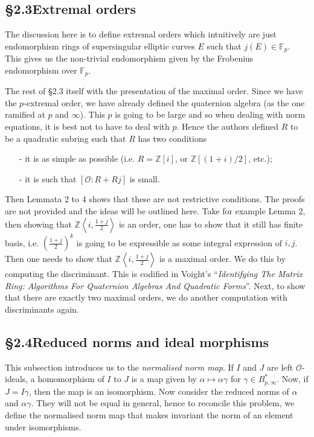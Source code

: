 \documentclass{amsart}
\theoremstyle{definition}\newtheorem*{defn}{Definition}
\theoremstyle{definition}\newtheorem*{eg}{Example}
\newcommand{\F}{\mathbb{F}}
\renewcommand{\O}{\mathcal{O}}
\newcommand{\Z}{\mathbb{Z}}
\begin{document}
\subsection*{\S2.3\hspace{0.5cm}Extremal orders}
The discussion here is to define extremal orders which intuitively are just endomorphism rings of supersingular elliptic curves $E$ such that $j(E)\in\F_p$. This gives us the non-trivial endomorphism given by the Frobenius endomorphism over $\F_p$.

The rest of \S2.3 itself with the presentation of the maximal order. Since we have the $p$-extremal order, we have already defined the quaternion algebra (as the one ramified at $p$ and $\infty$). This $p$ is going to be large and so when dealing with norm equations, it is best not to have to deal with $p$. Hence the authors defined $R$ to be a quadratic subring such that $R$ has two conditions
\begin{itemize}
\item[-] it is as simple as possible (i.e. $R=\Z[i]$, or $\Z[(1+i)/2]$, etc.);
\item[-] it is such that $[\O:R+Rj]$ is small.
\end{itemize}
Then Lemmata 2 to 4 shows that these are not restrictive conditions. The proofs are not provided and the ideas will be outlined here. Take for example Lemma 2, then showing that $\Z\left\langle i,\frac{1+j}{2}\right\rangle$ is an order, one has to show that it still has finite basis, i.e. $\left(\frac{1+j}{2}\right)^k$ is going to be expressible as some integral expression of $i,j$. Then one needs to show that $\Z\left\langle i,\frac{1+j}{2}\right\rangle$ is a maximal order. We do this by computing the discriminant. This is codified in Voight's ``\textit{Identifying The Matrix Ring: Algorithms For Quaternion Algebras And Quadratic Forms}''. Next, to show that there are exactly two maximal orders, we do another computation with discriminants again.

\subsection*{\S2.4\hspace{0.5cm}Reduced norms and ideal morphisms}
This subsection introduces us to the \emph{normalised norm map}. If $I$ and $J$ are left $\O$-ideals, a homomorphism of $I$ to $J$ is a map given by $\alpha\mapsto\alpha\gamma$ for $\gamma\in B_{p,\infty}^*$. Now, if $J=I\gamma$, then the map is an isomorphism. Now consider the reduced norms of $\alpha$ and $\alpha\gamma$. They will not be equal in general, hence to reconcile this problem, we define the normalised norm map that makes invariant the norm of an element under isomorphisms.
\end{document}

